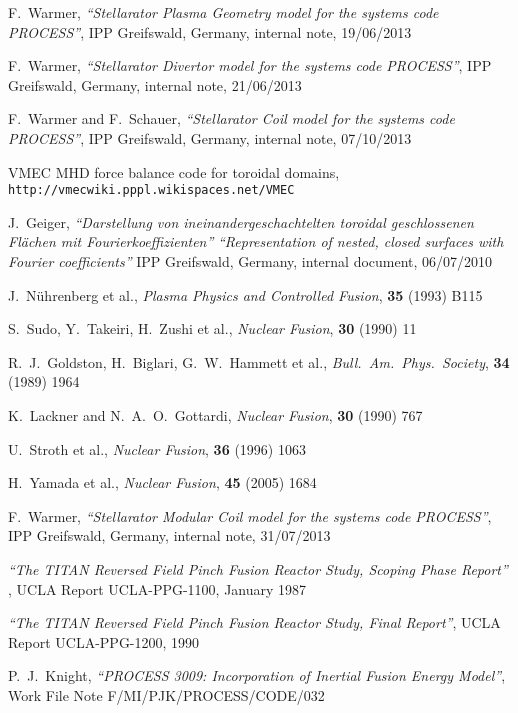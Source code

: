 \begin{thebibliography}{99}
F.\ Warmer,
\textit{``Stellarator Plasma Geometry model for the systems code PROCESS''},
IPP Greifswald, Germany, internal note, 19/06/2013

F.\ Warmer,
\textit{``Stellarator Divertor model for the systems code PROCESS''},
IPP Greifswald, Germany, internal note, 21/06/2013

F.\ Warmer and F.\ Schauer,
\textit{``Stellarator Coil model for the systems code PROCESS''},
IPP Greifswald, Germany, internal note, 07/10/2013

VMEC MHD force balance code for toroidal domains,
\texttt{http://vmecwiki.pppl.wikispaces.net/VMEC}

J.\ Geiger,
\textit{``Darstellung von ineinandergeschachtelten toroidal geschlossenen
  Fl\"{a}chen mit Fourierkoeffizienten''} \textit{``Representation of
  nested, closed surfaces with Fourier coefficients''}
IPP Greifswald, Germany, internal document, 06/07/2010

J.\ N\"{u}hrenberg et al., \textit{Plasma Physics and Controlled Fusion},
\textbf{35} (1993) B115

S.\ Sudo, Y.\ Takeiri, H.\ Zushi et al., \textit{Nuclear Fusion}, \textbf{30} (1990)
11

R.\ J.\ Goldston, H.\ Biglari, G.\ W.\ Hammett et al.,
\textit{Bull.\ Am.\ Phys.\ Society}, \textbf{34} (1989) 1964

K.\ Lackner and N.\ A.\ O.\ Gottardi,
\textit{Nuclear Fusion}, \textbf{30} (1990) 767

U.\ Stroth et al.,
\textit{Nuclear Fusion}, \textbf{36} (1996) 1063

H.\ Yamada et al.,
\textit{Nuclear Fusion}, \textbf{45} (2005) 1684

F.\ Warmer,
\textit{``Stellarator Modular Coil model for the systems code PROCESS''},
IPP Greifswald, Germany, internal note, 31/07/2013

\textit{``The TITAN Reversed Field Pinch Fusion Reactor Study, Scoping Phase
Report''} ,
UCLA Report UCLA-PPG-1100, January 1987

\textit{``The TITAN Reversed Field Pinch Fusion Reactor Study, Final Report''},
UCLA Report UCLA-PPG-1200, 1990

P.\ J.\ Knight,
\textit{``PROCESS 3009: Incorporation of Inertial Fusion Energy Model''},
Work File Note F/MI/PJK/PROCESS/CODE/032


\end{thebibliography}
